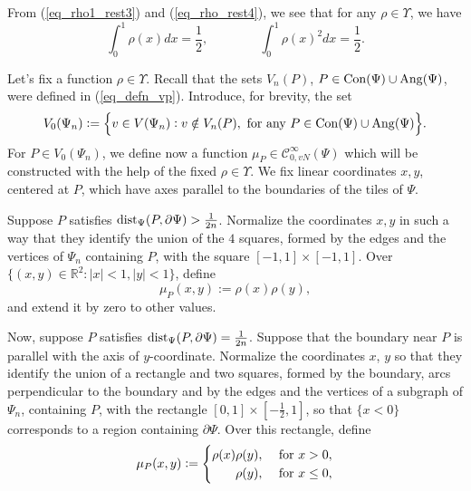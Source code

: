 \documentclass[12pt]{article}
\numberwithin{equation}{section}
\theoremstyle{theorem}
\theoremstyle{definition}
\theoremstyle{remark}
\newcommand{\real}{\mathbb{R}}
\newcommand{\dist}{{\rm{dist}}}
\newcommand{\ccal}{\mathscr{C}}
\begin{document}
	\par From (\ref{eq_rho1_rest3}) and (\ref{eq_rho_rest4}), we see that for any $\rho \in \Upsilon$, we have
	\begin{equation}\label{eq_rho__int}
		\int_0^{1} \rho(x) dx = \frac{1}{2}, \qquad \qquad \int_0^{1} \rho(x)^2 dx = \frac{1}{2}.
	\end{equation}
	\par 
	Let's fix a function $\rho \in \Upsilon$.
	Recall that the sets $V_n(P)$, $P \in {\rm{Con}}(\Psi) \cup {\rm{Ang}}(\Psi)$, were defined in (\ref{eq_defn_vp}).
	Introduce, for brevity, the set 
	\begin{equation}
		V_0(\Psi_n) := \Big\{
			v \in V(\Psi_n) : v \notin V_n(P), \text{ for any } P \in {\rm{Con}}(\Psi) \cup {\rm{Ang}}(\Psi)
		\Big\}.
	\end{equation}
	For $P \in V_0(\Psi_n)$, we define now a function $\mu_P \in \ccal^{\infty}_{0, vN}(\Psi)$ which will be constructed with the help of the fixed $\rho \in \Upsilon$. 
	We fix linear coordinates $x, y$, centered at $P$, which have axes parallel to the boundaries of the tiles of $\Psi$. 
	\par Suppose $P$ satisfies $\dist_{\Psi}(P, \partial \Psi) > \frac{1}{2n}$. 
	Normalize the coordinates $x, y$ in such a way that they identify the union of the $4$ squares, formed by the edges and the vertices of $\Psi_n$ containing $P$, with the square $[-1, 1] \times [-1, 1]$.
	Over $\{ (x, y) \in \real^2 : |x| < 1, |y| < 1 \}$, define 
	\begin{equation}
		\mu_{P}(x, y) := \rho(x)\rho(y),
	\end{equation}
	and extend it by zero to other values.
	\par Now, suppose $P$ satisfies $\dist_{\Psi}(P, \partial \Psi) = \frac{1}{2n}$. 
	Suppose that the boundary near $P$ is parallel with the axis of $y$-coordinate.
	Normalize the coordinates $x$, $y$ so that they identify the union of a rectangle and two squares, formed by the boundary, arcs perpendicular to the boundary and by the edges and the vertices of a subgraph of $\Psi_n$, containing $P$, with the rectangle $[0, 1] \times [-\frac{1}{2}, 1]$, so that $\{x < 0\}$ corresponds to a region containing $\partial \Psi$.
	Over this rectangle, define  
	\begin{equation}
		\mu_{P}(x, y) := 
		\begin{cases} 
			\hfill \rho(x)\rho(y), & \text{ for } x > 0, \\
			\hfill \rho(y), & \text{ for } x \leq 0,
 		\end{cases}
	\end{equation}
\end{document}
